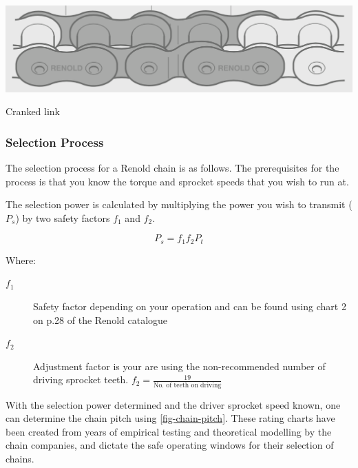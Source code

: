 \begin{marginfigure}
    \centering
    \includegraphics[width=\textwidth]{07_transmission_selection/cranked-link.png}
    \caption[Cranked link]{Cranked link~\cite
    [][p.11]{renoldchain}}
    \label{fig-cranked-link}
\end{marginfigure}

\subsubsection{Selection Process}

The selection process for a Renold chain is as follows. The prerequisites for the process is that you know the torque and sprocket speeds that you wish to run at.

The selection power is calculated by multiplying the power you wish to transmit (\(P_s\)) by two safety factors \(f_1\) and \(f_2\).

\begin{equation}
  P_s = f_1f_2P_t
\end{equation}

\noindent Where:

\begin{description}
  \item[\(f_1\)] Safety factor depending on your operation and can be found using chart 2 on p.28 of the Renold catalogue
  \item[\(f_2\)] Adjustment factor is your are using the non-recommended number of driving sprocket teeth. \(f_2=\frac{19}{\text{No. of teeth on driving}}\)
\end{description}

With the selection power determined and the driver sprocket speed known, one can determine the chain pitch using \cref{fig-chain-pitch}. These rating charts have been created from years of empirical testing and theoretical modelling by the chain companies, and dictate the safe operating windows for their selection of chains.

